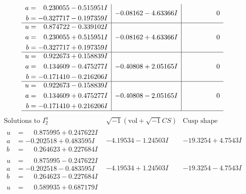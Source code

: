 \documentclass[1p]{elsarticle_modified}
\theoremstyle{definition}
\newcommand{\I}{\sqrt{-1}}
\begin{document}
$$\begin{array}{c|c|c}
\begin{aligned}
a &= \phantom{-}0.230055 - 0.515951 I \\
b &= -0.327717 - 0.197359 I\end{aligned}
 & -0.08162 - 4.63366 I & \phantom{-0.000000 } 0 \\ \hline\begin{aligned}
u &= \phantom{-}0.874722 - 0.339102 I \\
a &= \phantom{-}0.230055 + 0.515951 I \\
b &= -0.327717 + 0.197359 I\end{aligned}
 & -0.08162 + 4.63366 I & \phantom{-0.000000 } 0 \\ \hline\begin{aligned}
u &= \phantom{-}0.922673 + 0.158839 I \\
a &= \phantom{-}0.134609 - 0.475277 I \\
b &= -0.171410 - 0.216206 I\end{aligned}
 & -0.40808 + 2.05165 I & \phantom{-0.000000 } 0 \\ \hline\begin{aligned}
u &= \phantom{-}0.922673 - 0.158839 I \\
a &= \phantom{-}0.134609 + 0.475277 I \\
b &= -0.171410 + 0.216206 I\end{aligned}
 & -0.40808 - 2.05165 I & \phantom{-0.000000 } 0\\
 \hline 
 \end{array}$$\newpage$$\begin{array}{c|c|c}  
\text{Solutions to }I^u_{2}& \I (\text{vol} + \sqrt{-1}CS) & \text{Cusp shape}\\
 \hline 
\begin{aligned}
u &= \phantom{-}0.875995 + 0.247622 I \\
a &= -0.202518 + 0.483595 I \\
b &= \phantom{-}0.264623 + 0.227684 I\end{aligned}
 & -4.19534 - 1.24503 I & -19.3254 + 4.7543 I \\ \hline\begin{aligned}
u &= \phantom{-}0.875995 - 0.247622 I \\
a &= -0.202518 - 0.483595 I \\
b &= \phantom{-}0.264623 - 0.227684 I\end{aligned}
 & -4.19534 + 1.24503 I & -19.3254 - 4.7543 I \\ \hline\begin{aligned}
u &= \phantom{-}0.589935 + 0.687179 I \\

\end{aligned}
\end{array}$$
\end{document}

